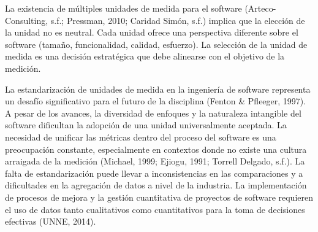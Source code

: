 \documentclass[11pt]{article}
\begin{document}
La existencia de múltiples unidades de medida para el software (Arteco-Consulting, s.f.; Pressman, 2010; Caridad Simón, s.f.) implica que la elección de la unidad no es neutral. Cada unidad ofrece una perspectiva diferente sobre el software (tamaño, funcionalidad, calidad, esfuerzo). La selección de la unidad de medida es una decisión estratégica que debe alinearse con el objetivo de la medición.

La estandarización de unidades de medida en la ingeniería de software representa un desafío significativo para el futuro de la disciplina (Fenton \& Pfleeger, 1997). A pesar de los avances, la diversidad de enfoques y la naturaleza intangible del software dificultan la adopción de una unidad universalmente aceptada. La necesidad de unificar las métricas dentro del proceso del software es una preocupación constante, especialmente en contextos donde no existe una cultura arraigada de la medición (Michael, 1999; Ejiogu, 1991; Torrell Delgado, s.f.). La falta de estandarización puede llevar a inconsistencias en las comparaciones y a dificultades en la agregación de datos a nivel de la industria. La implementación de procesos de mejora y la gestión cuantitativa de proyectos de software requieren el uso de datos tanto cualitativos como cuantitativos para la toma de decisiones efectivas (UNNE, 2014).
\end{document}
